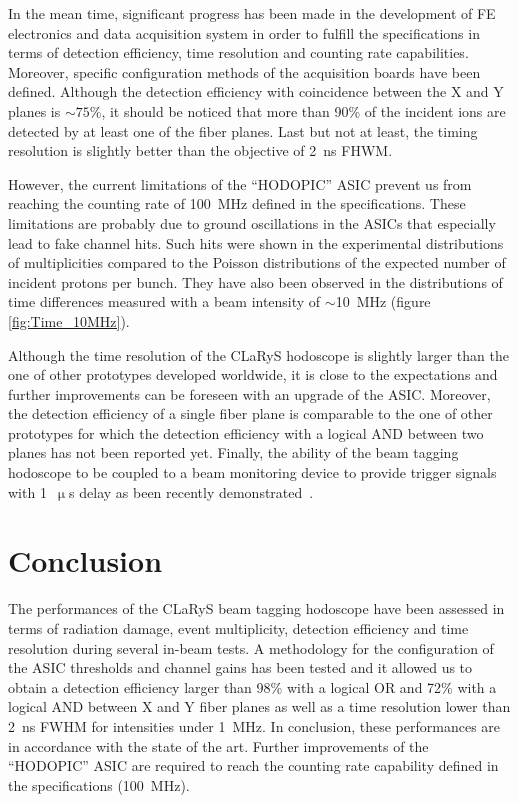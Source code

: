 \documentclass[a4paper,11pt]{article}
\begin{document}
In the mean time, significant progress has been made in the development of FE electronics and data acquisition system in order to fulfill the specifications in terms of detection efficiency, time resolution and counting rate capabilities. Moreover, specific configuration methods of the acquisition boards have been defined. Although the detection efficiency with coincidence between the X and Y planes is $\sim75$\%, it should be noticed that more than 90\% of the incident ions are detected by at least one of the fiber planes. Last but not at least, the timing resolution is slightly better than the objective of 2~ns FHWM. 

However, the current limitations of the \enquote{HODOPIC} ASIC prevent us from reaching the counting rate of 100~MHz defined in the specifications. These limitations are probably due to ground oscillations in the ASICs that especially lead to fake channel hits. Such hits were shown in the experimental distributions of multiplicities compared to the Poisson distributions of the expected number of incident protons per bunch. They have also been observed in the distributions of time differences measured with a beam intensity of $\sim$10~MHz (figure \ref{fig:Time_10MHz}).


Although the time resolution of the CLaRyS hodoscope is slightly larger than the one of other prototypes developed worldwide, it is close to the expectations and further improvements can be foreseen with an upgrade of the ASIC. Moreover, the detection efficiency of a single fiber plane is comparable to the one of other prototypes for which the detection efficiency with a logical AND between two planes has not been reported yet. Finally, the ability of the beam tagging hodoscope to be coupled to a beam monitoring device to provide trigger signals with 1~$\upmu$s delay as been recently demonstrated~\cite{Chen2019}.


\section{Conclusion}

The performances of the CLaRyS beam tagging hodoscope have been assessed in terms of radiation damage, event multiplicity, detection efficiency and time resolution during several in-beam tests. A methodology for the configuration of the ASIC thresholds and channel gains has been tested and it allowed us to obtain a detection efficiency larger than 98\% with a logical OR and 72\% with a logical AND between X and Y fiber planes as well as a time resolution lower than 2~ns FWHM for intensities under 1~MHz. In conclusion, these performances are in accordance with the state of the art. Further improvements of the \enquote{HODOPIC} ASIC are required to reach the counting rate capability defined in the specifications (100~MHz).
\end{document}

